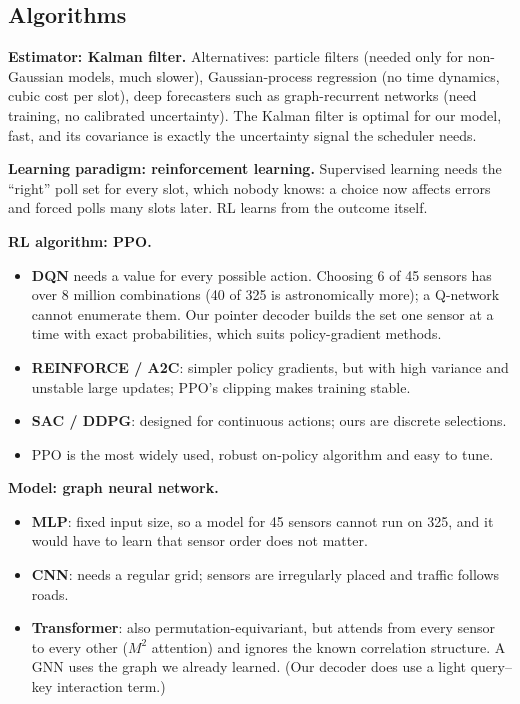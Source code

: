 \subsection{Algorithms}

\textbf{Estimator: Kalman filter.} Alternatives: particle filters (needed only for non-Gaussian models, much slower),
Gaussian-process regression (no time dynamics, cubic cost per slot), deep forecasters such as graph-recurrent networks
(need training, no calibrated uncertainty). The Kalman filter is optimal for our model, fast, and its covariance is
exactly the uncertainty signal the scheduler needs.

\textbf{Learning paradigm: reinforcement learning.} Supervised learning needs the ``right'' poll set for every slot,
which nobody knows: a choice now affects errors and forced polls many slots later. RL learns from the outcome itself.

\textbf{RL algorithm: PPO.}
\begin{itemize}
  \item \textbf{DQN} needs a value for every possible action. Choosing 6 of 45 sensors has over 8 million combinations
        (40 of 325 is astronomically more); a Q-network cannot enumerate them. Our pointer decoder builds the set one
        sensor at a time with exact probabilities, which suits policy-gradient methods.
  \item \textbf{REINFORCE / A2C}: simpler policy gradients, but with high variance and unstable large updates; PPO's
        clipping makes training stable.
  \item \textbf{SAC / DDPG}: designed for continuous actions; ours are discrete selections.
  \item PPO is the most widely used, robust on-policy algorithm and easy to tune.
\end{itemize}

\textbf{Model: graph neural network.}
\begin{itemize}
  \item \textbf{MLP}: fixed input size, so a model for 45 sensors cannot run on 325, and it would have to learn that
        sensor order does not matter.
  \item \textbf{CNN}: needs a regular grid; sensors are irregularly placed and traffic follows roads.
  \item \textbf{Transformer}: also permutation-equivariant, but attends from every sensor to every other ($M^2$
        attention) and ignores the known correlation structure. A GNN uses the graph we already learned. (Our decoder
        does use a light query--key interaction term.)
\end{itemize}

